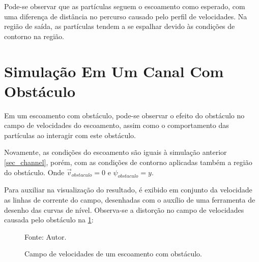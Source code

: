 Pode-se observar que as partículas seguem o escoamento como esperado, com uma diferença de distância no percurso causado pelo perfil de velocidades.
Na região de saída, as partículas tendem a se espalhar devido às condições de contorno na região.

\section{\textbf{Simulação Em Um Canal Com Obstáculo}}
\label{sec_obstacle}
Em um escoamento com obstáculo, pode-se observar o efeito do obstáculo no campo de velocidades do escoamento, assim como o comportamento das partículas ao interagir com este obstáculo.

Novamente, as condições do escoamento são iguais à simulação anterior \ref{sec_channel}, porém, com as condições de contorno aplicadas também a região do obstáculo.
Onde $\vec{v}_{obstaculo}=0$ e $\psi_{obstaculo}=y$.

Para auxiliar na visualização do resultado, é exibido em conjunto da velocidade as linhas de corrente do campo, desenhadas com o auxílio de uma ferramenta de desenho das curvas de nível.
Observa-se a distorção no campo de velocidades causada pelo obstáculo na \ref{obstacle_result}:
\begin{figure}[H]
    \centering
     {\raggedleft \scriptsize Fonte: Autor.}
    \caption{Campo de velocidades de um escoamento com obstáculo.}
    \label{obstacle_result}
\end{figure}

